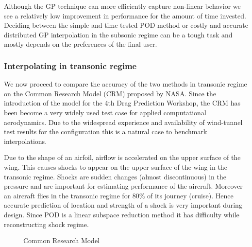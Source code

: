 Although the GP technique can more efficiently capture non-linear behavior we see a relatively low improvement in performance for the amount of time invested. Deciding between the simple and time-tested POD method or costly and accurate distributed GP interpolation in the subsonic regime can be a tough task and mostly depends on the preferences of the final user.

\subsubsection{Interpolating in transonic regime}\label{subSec:resultsCRM}
We now proceed to compare the accuracy of the two methods in transonic regime on the Common Research Model (CRM)  proposed by NASA. Since the introduction of the model for the 4th Drag Prediction Workshop, the CRM has been become a very widely used test case for applied computational aerodynamics. Due to the widespread experience and availability of wind-tunnel test results for the configuration this is a natural case to benchmark interpolations. 

Due to the shape of an airfoil, airflow is accelerated on the upper surface of the wing. This causes shocks to appear on the upper surface of the wing in the transonic regime. Shocks are sudden changes (almost discontinuous) in the pressure and are important for estimating performance of the aircraft. Moreover an aircraft flies in the transonic regime for 80\% of its journey (cruise). Hence accurate prediction of location and strength of a shock is very important during design. Since POD is a linear subspace reduction method it has difficulty while reconstructing shock regime.

\begin{figure}[!ht]
  \centering
  \quad
  \caption{Common Research Model}
\end{figure}

